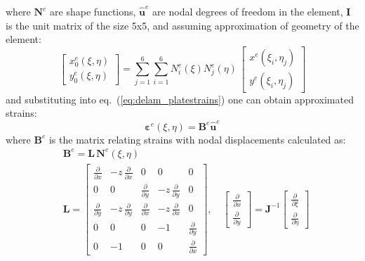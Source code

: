\documentclass[preprint,12pt]{elsarticle}
\renewcommand{\vec}[1]{\mathbf{#1}}
\renewcommand{\bm}[1]{\mathbf{#1}}
\newcommand{\bs}[1]{\boldsymbol{#1}}
\begin{document}
	where $\bm{N}^e$ are shape functions, $\vec{\hat{u}}^e$ are nodal degrees of freedom in the element, $\bm{I}$ is the unit matrix of the size 5x5, and assuming approximation of geometry of the element:	\begin{equation}
	\left[\begin{array}{l} x_0^e(\xi, \eta) \\ y_0^e(\xi, \eta)  \end{array}\right] = \sum \limits_{j=1}^{6} \sum \limits_{i=1}^{6} N^e_i(\xi) N^e_j(\eta)\, \left[ \begin{array}{l} x^e(\xi_i,\eta_j)\\y^e(\xi_i,\eta_j)\end{array} \right]\label{eq:delam_plategeom}
	\end{equation}  
	and substituting into eq.~(\ref{eq:delam_platestrains}) one can obtain approximated strains: 
	\begin{equation}
	\bs{\varepsilon}^e(\xi,\eta) = 	\vec{B}^e \vec{\hat{u}}^e \label{eq:delam_plate_relat}
	\end{equation} 
	where $	\vec{B}^e$ is the matrix relating strains with nodal displacements calculated as:
	\begin{equation}
	\begin{split}
	& \vec{B}^e =  \bm{L} \, \bm{N}^e\!(\xi,\eta) \\ 
	& \bm{L} = \left[\begin{array}{ccccc} \frac{\partial}{\partial x} & -z\, \frac{\partial}{\partial x} & 0 & 0 & 0 \\[4pt]
	0&0&\frac{\partial}{\partial y}&-z\, \frac{\partial}{\partial y}&0\\[4pt]
	\frac{\partial}{\partial y} &-z\,\frac{\partial}{\partial y} & \frac{\partial}{\partial x} &-z\,  \frac{\partial}{\partial x} &0 \\[4pt]
	0&0&0&-1&\frac{\partial}{\partial y} \\[4pt]
	0&-1&0&0&\frac{\partial}{\partial x} \end{array} \right], \quad \left[\begin{array}{c}\frac{\partial }{\partial x}\\[4pt] \frac{\partial }{\partial y}\end{array}\right] = \vec{J}^{-1} \left[\begin{array}{c}\frac{\partial }{\partial \xi}\\[4pt] \frac{\partial }{\partial \eta}\end{array}\right]
	\label{eq:delam_plate_disp_strains}
	\end{split}
	\end{equation} 
\end{document}
